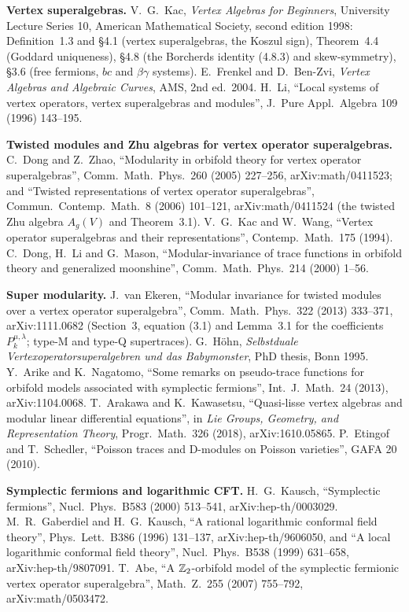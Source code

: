\textbf{Vertex superalgebras.} V.~G.~Kac, \emph{Vertex Algebras for Beginners}, University Lecture
Series 10, American Mathematical Society, second edition 1998: Definition~1.3 and §4.1 (vertex
superalgebras, the Koszul sign), Theorem~4.4 (Goddard uniqueness), §4.8 (the Borcherds identity
(4.8.3) and skew-symmetry), §3.6 (free fermions, $bc$ and $\beta\gamma$ systems). E.~Frenkel and
D.~Ben-Zvi, \emph{Vertex Algebras and Algebraic Curves}, AMS, 2nd ed.\ 2004. H.~Li, ``Local systems of
vertex operators, vertex superalgebras and modules'', J.\ Pure Appl.\ Algebra 109 (1996) 143--195.

\textbf{Twisted modules and Zhu algebras for vertex operator superalgebras.} C.~Dong and Z.~Zhao,
``Modularity in orbifold theory for vertex operator superalgebras'', Comm.\ Math.\ Phys.\ 260 (2005)
227--256, arXiv:math/0411523; and ``Twisted representations of vertex operator superalgebras'', Commun.\
Contemp.\ Math.\ 8 (2006) 101--121, arXiv:math/0411524 (the twisted Zhu algebra $A_g(V)$ and
Theorem~3.1). V.~G.~Kac and W.~Wang, ``Vertex operator superalgebras and their representations'',
Contemp.\ Math.\ 175 (1994). C.~Dong, H.~Li and G.~Mason, ``Modular-invariance of trace functions in
orbifold theory and generalized moonshine'', Comm.\ Math.\ Phys.\ 214 (2000) 1--56.

\textbf{Super modularity.} J.~van Ekeren, ``Modular invariance for twisted modules over a vertex operator
superalgebra'', Comm.\ Math.\ Phys.\ 322 (2013) 333--371, arXiv:1111.0682 (Section~3, equation (3.1)
and Lemma~3.1 for the coefficients $P^{\mu,\lambda}_k$; type-M and type-Q supertraces). G.~Höhn,
\emph{Selbstduale Vertexoperatorsuperalgebren und das Babymonster}, PhD thesis, Bonn 1995. Y.~Arike and
K.~Nagatomo, ``Some remarks on pseudo-trace functions for orbifold models associated with symplectic
fermions'', Int.\ J.\ Math.\ 24 (2013), arXiv:1104.0068. T.~Arakawa and K.~Kawasetsu, ``Quasi-lisse
vertex algebras and modular linear differential equations'', in \emph{Lie Groups, Geometry, and
Representation Theory}, Progr.\ Math.\ 326 (2018), arXiv:1610.05865. P.~Etingof and T.~Schedler,
``Poisson traces and D-modules on Poisson varieties'', GAFA 20 (2010).

\textbf{Symplectic fermions and logarithmic CFT.} H.~G.~Kausch, ``Symplectic fermions'', Nucl.\ Phys.\
B583 (2000) 513--541, arXiv:hep-th/0003029. M.~R.~Gaberdiel and H.~G.~Kausch, ``A rational logarithmic
conformal field theory'', Phys.\ Lett.\ B386 (1996) 131--137, arXiv:hep-th/9606050, and ``A local
logarithmic conformal field theory'', Nucl.\ Phys.\ B538 (1999) 631--658, arXiv:hep-th/9807091.
T.~Abe, ``A ${\mathbb{Z}}_2$-orbifold model of the symplectic fermionic vertex operator superalgebra'', Math.\
Z.\ 255 (2007) 755--792, arXiv:math/0503472.

